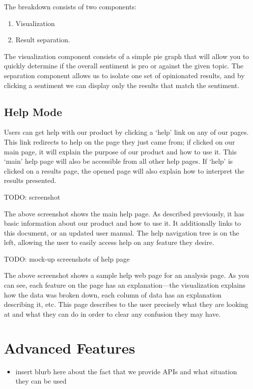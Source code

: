 \documentclass[titlepage]{article}
\begin{document}
The breakdown consists of two components:
\begin{enumerate}
\item Visualization
\item Result separation.
\end{enumerate}

The visualization component consists of a simple pie graph that will allow you
to quickly determine if the overall sentiment is pro or against the given
topic.  The separation component allows us to isolate one set of opinionated
results, and by clicking a sentiment we can display only the results that
match the sentiment.


\subsection{Help Mode}
Users can get help with our product by clicking a `help' link on any of our
pages.  This link redirects to help on the page they just came from; if
clicked on our main page, it will explain the purpose of our product and how
to use it.  This `main' help page will also be accessible from all other help
pages.  If `help' is clicked on a results page, the opened page will also
explain how to interpret the results presented.

    TODO: screenshot

The above screenshot shows the main help page.  As described previously, it
has basic information about our product and how to use it.  It additionally
links to this document, or an updated user manual.  The help navigation tree
is on the left, allowing the user to easily access help on any feature they
desire.

    TODO: mock-up screenshots of help page

The above screenshot shows a sample help web page for an analysis page.  As
you can see, each feature on the page has an explanation---the visualization
explains how the data was broken down, each column of data has an explanation
describing it, etc.  This page describes to the user precisely what they are
looking at and what they can do in order to clear any confusion they may
have.

\section{Advanced Features}
\begin{itemize}
\item insert blurb here about the fact that we provide APIs and what situation
they can be used
\end{itemize}
\end{document}
